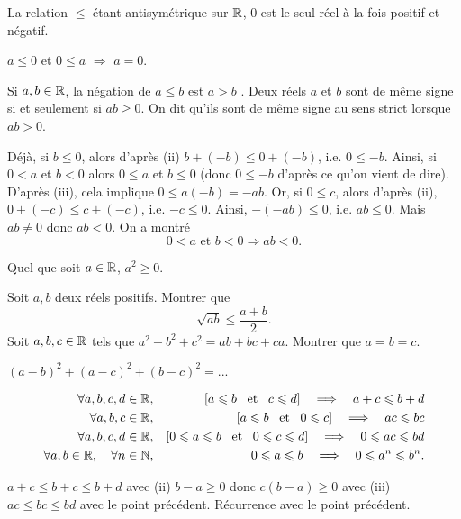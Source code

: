 \documentclass{magnolia}
\begin{document}
\begin{remarques}
\remarque La relation $\leq$ étant antisymétrique sur $\mathbb{R}$, 0 est le seul réel
  à la fois positif et négatif.
  \begin{sol}
  $a\leq 0$ et $0\leq a$ $\Rightarrow$ $a=0$.
  \end{sol}
\remarque Si $a,b\in\mathbb{R}$, la négation de \og $a\leq b$ \fg  est \og $a>b$ \fg.
\remarque Deux réels $a$ et $b$ sont de même signe si et
  seulement si $ab\geq 0$. On dit qu'ils sont de même signe au sens strict
  lorsque $ab>0$.
\begin{sol}
Déjà, si $b\leq 0$, alors d'après (ii) $b+(-b)\leq 0+(-b)$, i.e. $0\leq -b$.
Ainsi, si $0<a$ et $b<0$ alors $0\leq a$ et $b\leq 0$ (donc $0\leq -b$ d'après ce qu'on vient de dire). D'après (iii), cela implique $0\leq a(-b)=-ab$.
Or, si $0\leq c$, alors d'après (ii), $0+(-c)\leq c+(-c)$, i.e. $-c\leq 0$.
Ainsi, $-(-ab)\leq 0$, i.e. $ab\leq 0$. Mais $ab\neq 0$ donc $ab<0$.
On a montré $$0<a \text{ et } b<0 \Longrightarrow ab<0.$$
\end{sol}  
\remarque Quel que soit $a\in\mathbb{R}$, $a^2\geq 0$.
\end{remarques}

\begin{exos}
\exo Soit $a,b$ deux réels positifs. Montrer que
  \[\sqrt{ab}\leq\frac{a+b}{2}.\]
\exo Soit $a,b,c\in\mathbb{R}$ tels que $a^2+b^2+c^2=ab+bc+ca$. Montrer que
  $a=b=c$.
  \begin{sol}
  $(a-b)^2+(a-c)^2+(b-c)^2=...$
  \end{sol}
\end{exos}

\begin{proposition}
\begin{eqnarray*}
\forall a,b,c,d\in\mathbb{R}, & & \left[a\leqslant b \quad\!\text{et}\quad\! c\leqslant d\right]\quad\Longrightarrow\quad
       a+c\leqslant b+d\\
\forall a,b,c\in\mathbb{R}, & & \left[a\leqslant b \quad\!\text{et}\quad\! 0\leqslant c\right]\quad\Longrightarrow\quad ac\leqslant bc\\
\forall a,b,c,d\in\mathbb{R}, & & \left[0\leqslant a\leqslant b \quad\!\text{et}\quad\! 0\leqslant c\leqslant d\right]\quad\Longrightarrow\quad
       0\leqslant ac\leqslant bd\\
\forall a,b\in\mathbb{R}, \quad \forall n\in\mathbb{N}, & & 0\leqslant a\leqslant b \quad\Longrightarrow\quad
  0\leqslant a^n\leqslant b^n.
\end{eqnarray*}
\end{proposition}

\begin{preuve}
$a+c\leq b+c\leq b+d$ avec (ii)
$b-a\geq 0$ donc $c(b-a)\geq 0$ avec (iii)
$ac\leq bc \leq bd $ avec le point précédent.
Récurrence avec le point précédent.
\end{preuve}
\end{document}
